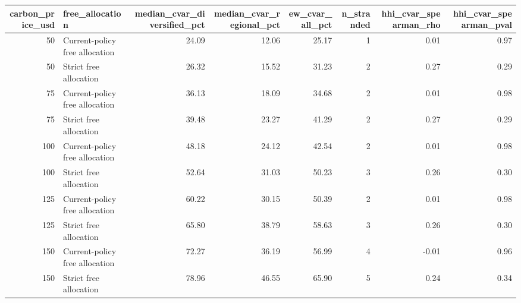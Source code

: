 \begin{tabular}{rlrrrrrr}
\toprule
carbon_price_usd & free_allocation & median_cvar_diversified_pct & median_cvar_regional_pct & ew_cvar_all_pct & n_stranded & hhi_cvar_spearman_rho & hhi_cvar_spearman_pval \\
\midrule
50 & Current-policy free allocation & 24.09 & 12.06 & 25.17 & 1 & 0.01 & 0.97 \\
50 & Strict free allocation & 26.32 & 15.52 & 31.23 & 2 & 0.27 & 0.29 \\
75 & Current-policy free allocation & 36.13 & 18.09 & 34.68 & 2 & 0.01 & 0.98 \\
75 & Strict free allocation & 39.48 & 23.27 & 41.29 & 2 & 0.27 & 0.29 \\
100 & Current-policy free allocation & 48.18 & 24.12 & 42.54 & 2 & 0.01 & 0.98 \\
100 & Strict free allocation & 52.64 & 31.03 & 50.23 & 3 & 0.26 & 0.30 \\
125 & Current-policy free allocation & 60.22 & 30.15 & 50.39 & 2 & 0.01 & 0.98 \\
125 & Strict free allocation & 65.80 & 38.79 & 58.63 & 3 & 0.26 & 0.30 \\
150 & Current-policy free allocation & 72.27 & 36.19 & 56.99 & 4 & -0.01 & 0.96 \\
150 & Strict free allocation & 78.96 & 46.55 & 65.90 & 5 & 0.24 & 0.34 \\
\bottomrule
\end{tabular}
